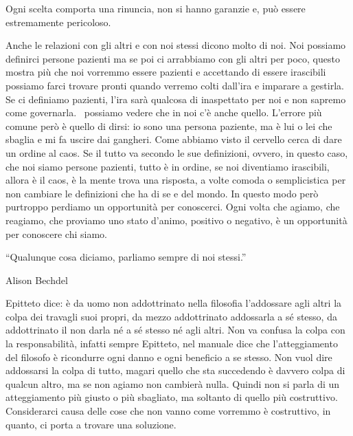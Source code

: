 \documentclass[12pt]{book} %
\begin{document}
Ogni scelta comporta una rinuncia, non si hanno garanzie e, può essere estremamente pericoloso. 


\bigskip

Anche le relazioni con gli altri e con noi stessi dicono molto di noi. Noi possiamo definirci persone pazienti ma se poi
ci arrabbiamo con gli altri per poco, questo mostra più che noi vorremmo essere pazienti e accettando di essere
irascibili possiamo farci trovare pronti quando verremo colti dall'ira e imparare a gestirla. Se
ci definiamo pazienti, l'ira sarà qualcosa di inaspettato per noi e non sapremo come governarla.
\ possiamo vedere che in noi c'è anche quello. L'errore più comune però è quello di dirsi: io sono una persona
paziente, ma è lui o lei che sbaglia e mi fa uscire dai gangheri. Come abbiamo visto il cervello cerca di dare un
ordine al caos. Se il tutto va secondo le sue definizioni, ovvero, in questo caso, che noi siamo persone pazienti,
tutto è in ordine, se noi diventiamo irascibili, allora è il caos, è la mente trova una risposta, a volte comoda o
semplicistica per non cambiare le definizioni che ha di se e del mondo. In questo modo però purtroppo perdiamo un
opportunità per conoscerci. Ogni volta che agiamo, che reagiamo, che proviamo uno stato d'animo,
positivo o negativo, è un opportunità per conoscere chi siamo.


\bigskip

“Qualunque cosa diciamo, parliamo sempre di noi stessi.”

Alison Bechdel


\bigskip

Epitteto dice: è da uomo non addottrinato nella filosofia l'addossare agli altri la colpa dei
travagli suoi propri, da mezzo addottrinato addossarla a sé stesso, da addottrinato il non darla né a sé stesso né agli
altri. Non va confusa la colpa con la responsabilità, infatti sempre Epitteto, nel manuale dice che
l'atteggiamento del filosofo è ricondurre ogni danno e ogni beneficio a se stesso. Non vuol dire
addossarsi la colpa di tutto, magari quello che sta succedendo è davvero colpa di qualcun altro, ma se non agiamo non
cambierà nulla. Quindi non si parla di un atteggiamento più giusto o più sbagliato, ma soltanto di quello più
costruttivo. Considerarci causa delle cose che non vanno come vorremmo è costruttivo, in quanto, ci porta a trovare una
soluzione. 


\bigskip
\end{document}

